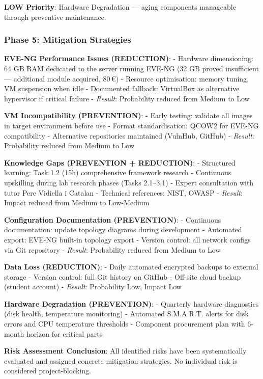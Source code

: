 \textbf{LOW Priority}: Hardware Degradation --- aging components manageable through preventive maintenance.

\subsubsection{Phase 5: Mitigation Strategies}

\textbf{EVE-NG Performance Issues (REDUCTION)}: - Hardware dimensioning: 64 GB RAM dedicated to the server running EVE-NG (32 GB proved insufficient --- additional module acquired, 80\,€) - Resource optimisation: memory tuning, VM suspension when idle - Documented fallback: VirtualBox as alternative hypervisor if critical failure - \emph{Result}: Probability reduced from Medium to Low

\textbf{VM Incompatibility (PREVENTION)}: - Early testing: validate all images in target environment before use - Format standardisation: QCOW2 for EVE-NG compatibility - Alternative repositories maintained (VulnHub, GitHub) - \emph{Result}: Probability reduced from Medium to Low

\textbf{Knowledge Gaps (PREVENTION + REDUCTION)}: - Structured learning: Task 1.2 (15h) comprehensive framework research - Continuous upskilling during lab research phases (Tasks 2.1--3.1) - Expert consultation with tutor Pere Vidiella i Catalan - Technical references: NIST, OWASP - \emph{Result}: Impact reduced from Medium to Low-Medium

\textbf{Configuration Documentation (PREVENTION)}: - Continuous documentation: update topology diagrams during development - Automated export: EVE-NG built-in topology export - Version control: all network configs via Git repository - \emph{Result}: Probability reduced from Medium to Low

\textbf{Data Loss (REDUCTION)}: - Daily automated encrypted backups to external storage - Version control: full Git history on GitHub - Off-site cloud backup (student account) - \emph{Result}: Probability Low, Impact Low

\textbf{Hardware Degradation (PREVENTION)}: - Quarterly hardware diagnostics (disk health, temperature monitoring) - Automated S.M.A.R.T. alerts for disk errors and CPU temperature thresholds - Component procurement plan with 6-month horizon for critical parts

\textbf{Risk Assessment Conclusion}: All identified risks have been systematically evaluated and assigned concrete mitigation strategies. No individual risk is considered project-blocking.

